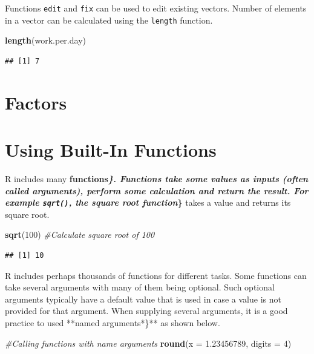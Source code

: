 \documentclass[]{krantz}
\makeatletter
\newenvironment{Shaded}{\begin{snugshade}}{\end{snugshade}}
\newcommand{\KeywordTok}[1]{\textcolor[rgb]{0.27,0.27,0.27}{\textbf{#1}}}
\newcommand{\DataTypeTok}[1]{\textcolor[rgb]{0.27,0.27,0.27}{#1}}
\newcommand{\DecValTok}[1]{\textcolor[rgb]{0.06,0.06,0.06}{#1}}
\newcommand{\FloatTok}[1]{\textcolor[rgb]{0.06,0.06,0.06}{#1}}
\newcommand{\CommentTok}[1]{\textcolor[rgb]{0.56,0.35,0.01}{\textit{#1}}}
\newcommand{\NormalTok}[1]{#1}
\newenvironment{kframe}{%
\medskip{}
\setlength{\fboxsep}{.8em}
 \def\at@end@of@kframe{}%
 \ifinner\ifhmode%
  \def\at@end@of@kframe{\end{minipage}}%
  \begin{minipage}{\columnwidth}%
 \fi\fi%
 \def\FrameCommand##1{\hskip\@totalleftmargin \hskip-\fboxsep
 \colorbox{shadecolor}{##1}\hskip-\fboxsep
     \hskip-\linewidth \hskip-\@totalleftmargin \hskip\columnwidth}%
 \MakeFramed {\advance\hsize-\width
   \@totalleftmargin\z@ \linewidth\hsize
   \@setminipage}}%
 {\par\unskip\endMakeFramed%
 \at@end@of@kframe}
\renewenvironment{Shaded}{\begin{kframe}}{\end{kframe}}
\theoremstyle{definition}
\theoremstyle{definition}
\theoremstyle{definition}
\theoremstyle{remark}
\makeatother
\begin{document}
Functions \texttt{edit} and \texttt{fix} can be used to edit existing
vectors. Number of elements in a vector can be calculated using the
\texttt{length} function.

\begin{Shaded}
\begin{Highlighting}[]
\KeywordTok{length}\NormalTok{(work.per.day)}
\end{Highlighting}
\end{Shaded}

\begin{verbatim}
## [1] 7
\end{verbatim}

\section{Factors}\label{factors}

\section{Using Built-In Functions}\label{using-built-in-functions}

R includes many \textbf{functions\emph{\}\textbf{. Functions take some
values as inputs (often called }arguments\textbf{), perform some
calculation and return the result. For example \texttt{sqrt()}, the
}square root function}\}} takes a value and returns its square root.

\begin{Shaded}
\begin{Highlighting}[]
\KeywordTok{sqrt}\NormalTok{(}\DecValTok{100}\NormalTok{) }\CommentTok{#Calculate square root of 100}
\end{Highlighting}
\end{Shaded}

\begin{verbatim}
## [1] 10
\end{verbatim}

R includes perhaps thousands of functions for different tasks. Some
functions can take several arguments with many of them being optional.
Such optional arguments typically have a default value that is used in
case a value is not provided for that argument. When supplying several
arguments, it is a good practice to used **named arguments*\}** as shown
below.

\begin{Shaded}
\begin{Highlighting}[]
\CommentTok{#Calling functions with name arguments}
\KeywordTok{round}\NormalTok{(}\DataTypeTok{x =} \FloatTok{1.23456789}\NormalTok{, }\DataTypeTok{digits =} \DecValTok{4}\NormalTok{) }
\end{Highlighting}
\end{Shaded}
\end{document}
